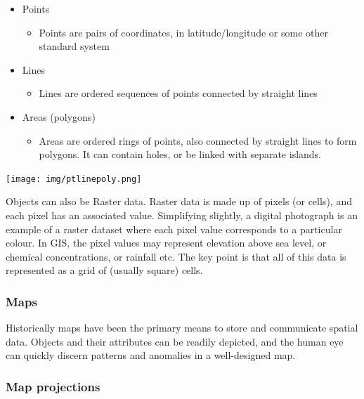 \documentclass[]{book}
\providecommand{\tightlist}{%
  \setlength{\itemsep}{0pt}\setlength{\parskip}{0pt}}
\begin{document}
\begin{itemize}
\tightlist
\item
  Points

  \begin{itemize}
  \tightlist
  \item
    Points are pairs of coordinates, in latitude/longitude or some other standard system
  \end{itemize}
\item
  Lines

  \begin{itemize}
  \tightlist
  \item
    Lines are ordered sequences of points connected by straight lines
  \end{itemize}
\item
  Areas (polygons)

  \begin{itemize}
  \tightlist
  \item
    Areas are ordered rings of points, also connected by straight lines to form polygons. It can contain holes, or be linked with separate islands.
  \end{itemize}
\end{itemize}

\texttt{[image: img/ptlinepoly.png]}

Objects can also be Raster data. Raster data is made up of pixels (or cells), and each pixel has an associated value. Simplifying slightly, a digital photograph is an example of a raster dataset where each pixel value corresponds to a particular colour. In GIS, the pixel values may represent elevation above sea level, or chemical concentrations, or rainfall etc. The key point is that all of this data is represented as a grid of (usually square) cells.

\hypertarget{maps}{%
\subsubsection{Maps}\label{maps}}

Historically maps have been the primary means to store and communicate spatial data. Objects and their attributes can be readily depicted, and the human eye can quickly discern patterns and anomalies in a well-designed map.

\hypertarget{map-projections}{%
\subsubsection{Map projections}\label{map-projections}}
\end{document}
